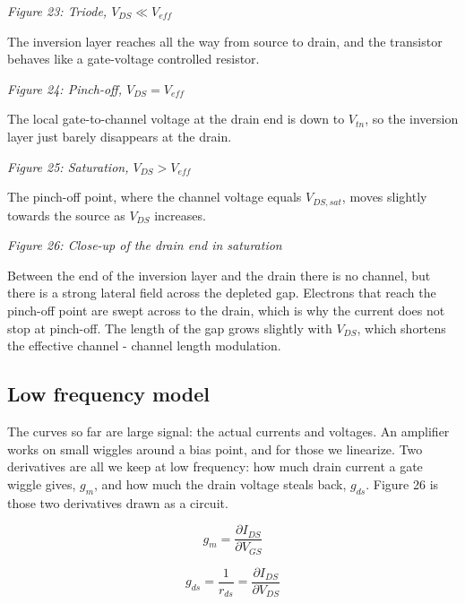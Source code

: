 {
\centering
{}
}

\emph{Figure 23: Triode, \(V_{DS} \ll V_{eff}\)}

The inversion layer reaches all the way from source to drain, and the
transistor behaves like a gate-voltage controlled resistor.


{
\centering
{}
}

\emph{Figure 24: Pinch-off, \(V_{DS} = V_{eff}\)}

The local gate-to-channel voltage at the drain end is down to
\(V_{tn}\), so the inversion layer just barely disappears at the drain.


{
\centering
{}
}

\emph{Figure 25: Saturation, \(V_{DS} > V_{eff}\)}

The pinch-off point, where the channel voltage equals \(V_{DS,sat}\),
moves slightly towards the source as \(V_{DS}\) increases.


{
\centering
{}
}

\emph{Figure 26: Close-up of the drain end in saturation}

Between the end of the inversion layer and the drain there is no
channel, but there is a strong lateral field across the depleted gap.
Electrons that reach the pinch-off point are swept across to the drain,
which is why the current does not stop at pinch-off. The length of the
gap grows slightly with \(V_{DS}\), which shortens the effective channel
- channel length modulation.

\subsection{Low frequency model}\label{low-frequency-model}

The curves so far are large signal: the actual currents and voltages. An
amplifier works on small wiggles around a bias point, and for those we
linearize. Two derivatives are all we keep at low frequency: how much
drain current a gate wiggle gives, \(g_m\), and how much the drain
voltage steals back, \(g_{ds}\). Figure 26 is those two derivatives
drawn as a circuit.

\[ g_{m} = \frac{\partial I_{DS}}{\partial V_{GS}} \]

\[ g_{ds} = \frac{1}{r_{ds}}  = \frac{\partial I_{DS}}{\partial V_{DS}} \]


